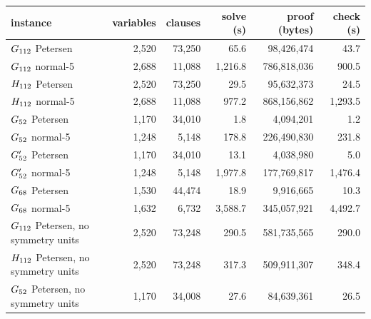 \begin{tabular}{lrrrrr}
\toprule
instance & variables & clauses & solve (s) & proof (bytes) & check (s)\\
\midrule
$G_{112}$ Petersen & 2{,}520 & 73{,}250 & 65.6 & 98{,}426{,}474 & 43.7\\
$G_{112}$ normal-5 & 2{,}688 & 11{,}088 & 1{,}216.8 & 786{,}818{,}036 & 900.5\\
$H_{112}$ Petersen & 2{,}520 & 73{,}250 & 29.5 & 95{,}632{,}373 & 24.5\\
$H_{112}$ normal-5 & 2{,}688 & 11{,}088 & 977.2 & 868{,}156{,}862 & 1{,}293.5\\
$G_{52}$ Petersen & 1{,}170 & 34{,}010 & 1.8 & 4{,}094{,}201 & 1.2\\
$G_{52}$ normal-5 & 1{,}248 & 5{,}148 & 178.8 & 226{,}490{,}830 & 231.8\\
$G'_{52}$ Petersen & 1{,}170 & 34{,}010 & 13.1 & 4{,}038{,}980 & 5.0\\
$G'_{52}$ normal-5 & 1{,}248 & 5{,}148 & 1{,}977.8 & 177{,}769{,}817 & 1{,}476.4\\
$G_{68}$ Petersen & 1{,}530 & 44{,}474 & 18.9 & 9{,}916{,}665 & 10.3\\
$G_{68}$ normal-5 & 1{,}632 & 6{,}732 & 3{,}588.7 & 345{,}057{,}921 & 4{,}492.7\\
$G_{112}$ Petersen, no symmetry units & 2{,}520 & 73{,}248 & 290.5 & 581{,}735{,}565 & 290.0\\
$H_{112}$ Petersen, no symmetry units & 2{,}520 & 73{,}248 & 317.3 & 509{,}911{,}307 & 348.4\\
$G_{52}$ Petersen, no symmetry units & 1{,}170 & 34{,}008 & 27.6 & 84{,}639{,}361 & 26.5\\
\bottomrule
\end{tabular}
